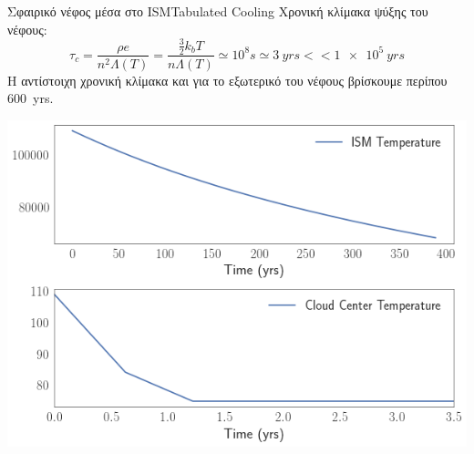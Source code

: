 \documentclass{beamer}
\begin{document}
\begin{frame}{Σφαιρικό νέφος μέσα στο ISM}{Tabulated Cooling}
Χρονική κλίμακα ψύξης του νέφους:
	\begin{equation}
	\tau _c =\frac{ \rho e} {n^2 \Lambda (T)}=
	\frac{ \frac{3}{2}k_b T} {n \Lambda (T)} 
	\simeq 10^8\si{s}\simeq \SI{3}{yrs} << \SI{1e5}{yrs}
	\end{equation}
	H αντίστοιχη χρονική κλίμακα και για το εξωτερικό του νέφους βρίσκουμε περίπου \SI{600}{yrs}. 
	
\begin{center}
	\includegraphics[width=0.55\linewidth]{../Document/DataImages/TabCoolingTMPcenterISM}
\end{center}
\end{frame}
\end{document}
